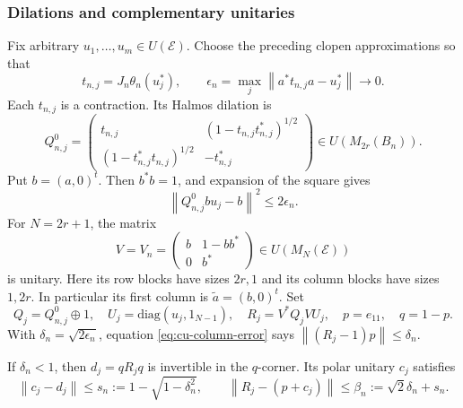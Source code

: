 \subsubsection{Dilations and complementary unitaries}

Fix arbitrary $u_1,\ldots,u_m\in U(\mathcal{E})$. Choose the preceding
clopen approximations so that 
\begin{equation*}
t_{n,j}=J_n\theta_n(u_j^*),\qquad
\epsilon_n=\max_j\left\|a^*t_{n,j}a-u_j^*\right\|\longrightarrow0.
\end{equation*}
Each $t_{n,j}$ is a contraction. Its Halmos dilation is 
\begin{equation*}
Q_{n,j}^0= 
\begin{pmatrix}
t_{n,j} & (1-t_{n,j}t_{n,j}^*)^{1/2} \\ 
(1-t_{n,j}^*t_{n,j})^{1/2} & -t_{n,j}^*\end{pmatrix}\in U(M_{2r}(B_n)).
\end{equation*}
Put $b=(a,0)^t$. Then $b^*b=1$, and expansion of the square gives 
\begin{equation}  \label{eq:cu-column-error}
\left\|Q_{n,j}^0bu_j-b\right\|^2\leq2\epsilon_n.
\end{equation}
For $N=2r+1$, the matrix 
\begin{equation*}
V=V_n=\begin{pmatrix}
b & 1-bb^* \\ 
0 & b^*\end{pmatrix}
\in U(M_N(\mathcal{E}))
\end{equation*}
is unitary. Here its row blocks have sizes $2r,1$ and its column blocks have
sizes $1,2r$. In particular its first column is $\widetilde a=(b,0)^t$. Set 
\begin{equation*}
Q_j=Q_{n,j}^0\oplus1,\quad U_j=\mathrm{diag}(u_j,1_{N-1}),\quad
R_j=V^*Q_jVU_j,\quad p=e_{11},\quad q=1-p.
\end{equation*}
With $\delta_n=\sqrt{2\epsilon_n}$, equation \eqref{eq:cu-column-error} says $\left\|(R_j-1)p\right\|\leq\delta_n$.

\begin{lemma}\label{lem:cu-polar}
 If $\delta_n<1$, then $d_j=qR_jq$ is invertible in the $q$-corner. Its polar unitary $c_j$ satisfies 
\begin{equation*}
\left\|c_j-d_j\right\|\leq s_n:=1-\sqrt{1-\delta_n^2},\qquad
\left\|R_j-(p+c_j)\right\|\leq\beta_n:=\sqrt2\delta_n+s_n.
\end{equation*}
\end{lemma}

